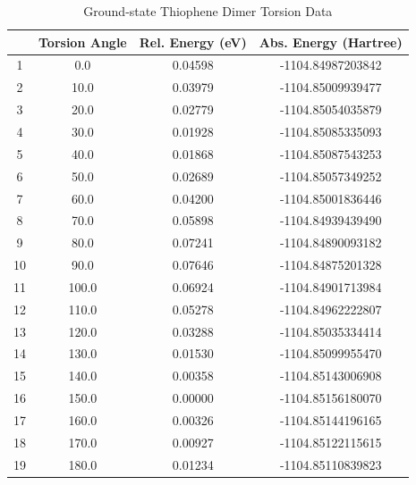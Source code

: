 \begin{table}[hbt!]\centering
\caption{Ground-state Thiophene Dimer Torsion Data}
\renewcommand{\arraystretch}{1.5}
\begin{threeparttable}
\begin{tabular}{cccc}\toprule
  {} & {Torsion Angle} & {Rel. Energy (eV)} & {Abs. Energy (Hartree)} \\ \midrule
    1 & 0.0 & 0.04598 & -1104.84987203842\\
    2 & 10.0 & 0.03979 & -1104.85009939477\\
    3 & 20.0 & 0.02779 & -1104.85054035879\\
    4 & 30.0 & 0.01928 & -1104.85085335093\\ \midrule
    5 & 40.0 & 0.01868 & -1104.85087543253\\
    6 & 50.0 & 0.02689 & -1104.85057349252\\
    7 & 60.0 & 0.04200  & -1104.85001836446\\
    8 & 70.0 & 0.05898 & -1104.84939439490\\ \midrule
    9 & 80.0 & 0.07241 & -1104.84890093182\\
    10 & 90.0 & 0.07646 & -1104.84875201328\\
    11 & 100.0 & 0.06924 & -1104.84901713984\\
    12 & 110.0 & 0.05278 & -1104.84962222807\\ \midrule
    13 & 120.0 & 0.03288 & -1104.85035334414\\
    14 & 130.0 & 0.01530 & -1104.85099955470\\
    15 & 140.0 & 0.00358 & -1104.85143006908\\
    16 & 150.0 & 0.00000 & -1104.85156180070\\ \midrule
    17 & 160.0 & 0.00326 & -1104.85144196165\\
    18 & 170.0 & 0.00927 & -1104.85122115615\\
    19 & 180.0 & 0.01234 & -1104.85110839823\\ \bottomrule
\end{tabular}
\begin{tablenotes}
\item
\end{tablenotes}
\end{threeparttable}
\end{table}

